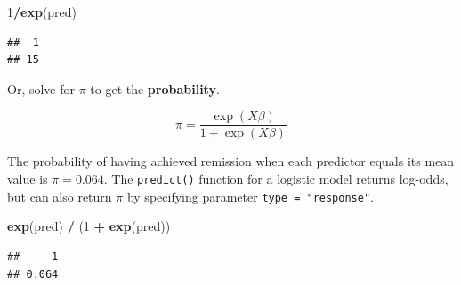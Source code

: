 \documentclass[
]{book}
\newenvironment{Shaded}{\begin{snugshade}}{\end{snugshade}}
\newcommand{\DataTypeTok}[1]{\textcolor[rgb]{0.13,0.29,0.53}{#1}}
\newcommand{\DecValTok}[1]{\textcolor[rgb]{0.00,0.00,0.81}{#1}}
\newcommand{\KeywordTok}[1]{\textcolor[rgb]{0.13,0.29,0.53}{\textbf{#1}}}
\newcommand{\NormalTok}[1]{#1}
\newcommand{\OperatorTok}[1]{\textcolor[rgb]{0.81,0.36,0.00}{\textbf{#1}}}
\newcommand{\StringTok}[1]{\textcolor[rgb]{0.31,0.60,0.02}{#1}}
\begin{document}
\begin{Shaded}
\begin{Highlighting}[]
\DecValTok{1}\OperatorTok{/}\KeywordTok{exp}\NormalTok{(pred)}
\end{Highlighting}
\end{Shaded}

\begin{verbatim}
##  1 
## 15
\end{verbatim}

Or, solve for \(\pi\) to get the \textbf{probability}.

\[\pi = \frac{\exp (X \beta)}{1 + \exp (X \beta)}\]

The probability of having achieved remission when each predictor equals its mean value is \(\pi = 0.064\). The \texttt{predict()} function for a logistic model returns log-odds, but can also return \(\pi\) by specifying parameter \texttt{type\ =\ "response"}.

\begin{Shaded}
\begin{Highlighting}[]
\KeywordTok{exp}\NormalTok{(pred) }\OperatorTok{/}\StringTok{ }\NormalTok{(}\DecValTok{1} \OperatorTok{+}\StringTok{ }\KeywordTok{exp}\NormalTok{(pred))}
\end{Highlighting}
\end{Shaded}

\begin{verbatim}
##     1 
## 0.064
\end{verbatim}

\begin{Shaded}
\end{Shaded}
\end{document}
